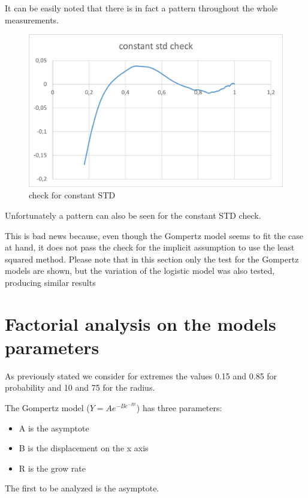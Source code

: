 It can be easily noted that there is in fact a pattern throughout the whole measurements.
\begin{figure}[H]
\centering
    \includegraphics[width= 1\textwidth]{./images/ConstantSTDCheck200.png}
    \caption{check for constant STD}
    \label{fig:coverage-percentage}
\end{figure}

Unfortunately a pattern can also be seen for the constant STD check. 

This is bad news because, even though the Gompertz model seems to fit the case at hand, it does not pass the check for the implicit assumption to use the least squared method.
Please note that in this section only the test for the Gompertz models are shown, but the variation of the logistic model was also tested, producing similar results

\iffalse
\section{Factorial analysis on the models parameters}
As previously stated we consider for extremes the values 0.15 and 0.85 for probability and 10 and 75 for the radius.

The Gompertz model ($ Y = Ae^{-Be^{-Rt}} $) has three parameters:
\begin{itemize}
	\item A is the asymptote
	\item B is the displacement on the x axis
	\item R is the grow rate
\end{itemize}
The first to be analyzed is the asymptote.

